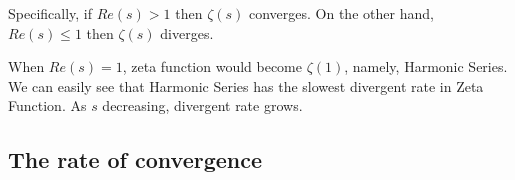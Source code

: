 \documentclass{article}
\begin{document}
  Specifically, if $Re(s) > 1$ then $\zeta(s)$ converges. On the other hand, $Re(s) \leq 1$ then $\zeta(s)$ diverges. 

  When $Re(s) = 1$, zeta function would become $\zeta(1)$, namely, Harmonic Series. \\

  We can easily see that Harmonic Series has the slowest divergent rate in Zeta Function. As $s$ decreasing, divergent rate grows. 







  \subsection{The rate of convergence}
\end{document}
